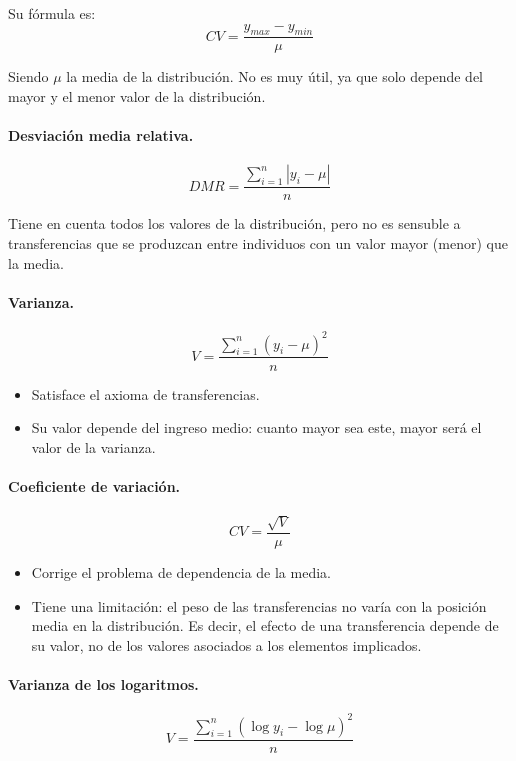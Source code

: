 Su f\'ormula es:
\[CV=\dfrac{y_{max}-y_{min}}{\mu}\]

Siendo $\mu$ la media de la distribuci\'on. No es muy \'util, ya que solo depende del mayor y el menor valor de la distribuci\'on.

\paragraph{Desviaci\'on media relativa.}

\[DMR=\dfrac{\sum_{i=1}^n|y_i-\mu|}{n}\]

Tiene en cuenta todos los valores de la distribuci\'on, pero no es sensuble a transferencias que se produzcan entre individuos con un valor mayor (menor) que la media.

\paragraph{Varianza.}

\[V=\dfrac{\sum_{i=1}^n(y_i-\mu)^2}{n}\]

\begin{itemize}
\item Satisface el axioma de transferencias.
\item Su valor depende del ingreso medio: cuanto mayor sea este, mayor ser\'a el valor de la varianza.
\end{itemize}

\paragraph{Coeficiente de variaci\'on.}

\[CV=\dfrac{\sqrt{V}}{\mu}\]

\begin{itemize}
\item Corrige el problema de dependencia de la media.
\item Tiene una limitaci\'on: el peso de las transferencias no var\'ia con la posici\'on media en la distribuci\'on. Es decir, el efecto de una transferencia depende de su valor, no de los valores asociados a los elementos implicados.
\end{itemize}

\paragraph{Varianza de los logaritmos.}
\[V=\dfrac{\sum_{i=1}^n(\log{y_i}-\log{\mu})^2}{n}\]

